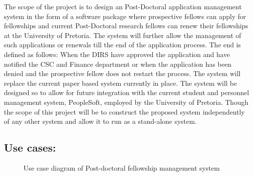 \documentclass[12pt]{article}
\begin{document}
The scope of the project is to design an Post-Doctoral application management system in the form of a software package where prospective fellows can apply for fellowships and current Post-Doctoral research fellows can renew their fellowships at the University of Pretoria. The system will further allow the management of such applications or renewals till the end of the application process. The end is defined as follows: When the DIRS have approved the application and have notified the CSC and Finance department or when the application has been denied and the prospective fellow does not restart the process. The system will replace the current paper based system currently in place. The system will be designed so to allow for future integration with the current student and personnel management system, PeopleSoft, employed by the University of Pretoria. Though the scope of this project will be to construct the proposed system independently of any other system and allow it to run as a stand-alone system.
\vspace{0.2in}

\subsection{Use cases:}

\begin{figure}[H]
\centering	
{}
\caption{Use case diagram of Post-doctoral fellowship management system}
\end{figure}
\end{document}
